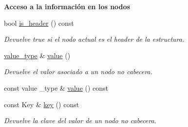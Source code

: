 \begin{Indent}\textbf{ Acceso a la información en los nodos}\par
\begin{DoxyCompactItemize}
\item 
bool \hyperlink{structaed2_1_1iterator_1_1Node_ac65ed5331c97b4a00f435c169283f92f_ac65ed5331c97b4a00f435c169283f92f}{is\+\_\+header} () const
\begin{DoxyCompactList}\small\item\em Devuelve true si el nodo actual es el header de la estructura. \end{DoxyCompactList}\item 
\hyperlink{classaed2_1_1iterator_a6411a2c08b2b7c52f063bef1a168acb6_a6411a2c08b2b7c52f063bef1a168acb6}{value\+\_\+type} \& \hyperlink{structaed2_1_1iterator_1_1Node_a968601069822105337814f963d79d635_a968601069822105337814f963d79d635}{value} ()
\begin{DoxyCompactList}\small\item\em Devuelve el valor asociado a un nodo no cabecera. \end{DoxyCompactList}\item 
const value \+\_\+type \& \hyperlink{structaed2_1_1iterator_1_1Node_ad96bf1d32de8726678dd95c687f7ee36_ad96bf1d32de8726678dd95c687f7ee36}{value} () const
\item 
const Key \& \hyperlink{structaed2_1_1iterator_1_1Node_ac97fa35ede63ba3d4ba1988b5f16cc00_ac97fa35ede63ba3d4ba1988b5f16cc00}{key} () const
\begin{DoxyCompactList}\small\item\em Devuelve la clave del valor de un nodo no cabecera. \end{DoxyCompactList}\end{DoxyCompactItemize}
\end{Indent}
